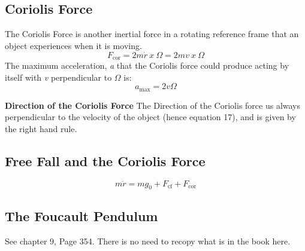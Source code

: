 \documentclass[11pt]{article}
\theoremstyle{definition}
\begin{document}
\subsection{Coriolis Force}
The Coriolis Force is another inertial force in a rotating reference frame that an object experiences when it is moving. 
\begin{equation}
F_{\text{cor}} = 2m\dot{r} \ x \ \Omega = 2mv \ x \ \Omega
\end{equation}
The maximum acceleration, \textit{a} that the Coriolis force could produce acting by itself with \textit{v} perpendicular to $\Omega$ is:
\begin{equation}
a_{\text{max}} = 2v\Omega 
\end{equation}
\begin{shaded}
\textbf{Direction of the Coriolis Force} \newline
The Direction of the Coriolis force us always perpendicular to the velocity of the object (hence equation 17), and is given by the right hand rule. 
\end{shaded}
\newpage
\subsection{Free Fall and the Coriolis Force}
\begin{equation}
m\ddot{r} = mg_0 + F_{\text{cf}} + F_{\text{cor}} 
\end{equation}
\subsection{The Foucault Pendulum}
See chapter 9, Page 354. There is no need to recopy what is in the book here. 
\end{document}
